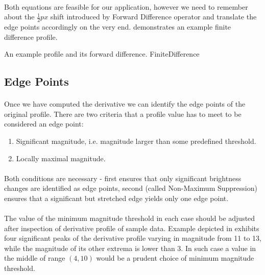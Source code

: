 \paragraph*{}
Both equations are feasible for our application, however we need to remember about the $\frac{1}{2}px$ shift introduced by Forward Difference operator and translate the edge points accordingly on the very end. 
 demonstrates an example finite difference profile.

\profileFigure
{
}
{An example profile and its forward difference.}
{FiniteDifference}


\subsection{Edge Points}
\paragraph*{}
Once we have computed the derivative we can identify the edge points of the original profile. There are two criteria that a profile value has to meet to be considered an edge point:
\begin{enumerate}
	\item Significant magnitude, i.e. magnitude larger than some predefined threshold.
	\item Locally maximal magnitude.
\end{enumerate}

\paragraph*{}
Both conditions are necessary - first ensures that only significant brightness changes are identified as edge points, second (called Non-Maximum Suppression) ensures that a significant but stretched edge yields only one edge point.

\paragraph*{}
The value of the minimum magnitude threshold in each case should be adjusted after inspection of derivative profile of sample data. Example depicted in  exhibits four significant peaks of the derivative profile varying in magnitude from 11 to 13, while the magnitude of its other extrema is lower than 3. In such case a value in the middle of range $(4, 10)$ would be a prudent choice of minimum magnitude threshold.

